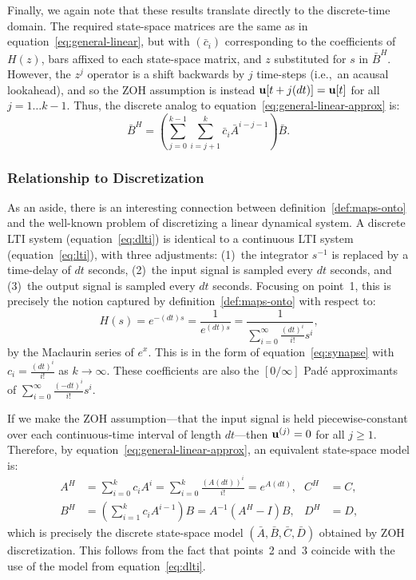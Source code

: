 Finally, we again note that these results translate directly to the discrete-time domain.
The required state-space matrices are the same as in equation~\ref{eq:general-linear}, but with $\left( \bar{c}_i \right)$ corresponding to the coefficients of $H(z)$, bars affixed to each state-space matrix, and $z$ substituted for $s$ in $\bar{B}^H$.
However, the $z^j$ operator is a shift backwards by $j$ time-steps (i.e.,~an acausal lookahead), and so the ZOH assumption is instead $\mathbf{u}[t+j(dt)] = \mathbf{u}[t]$ for all $j = 1 \ldots k - 1$.
Thus, the discrete analog to equation~\ref{eq:general-linear-approx} is:
\begin{equation}
\bar{B}^H = \left( \sum_{j=0}^{k-1} \sum_{i=j+1}^k \bar{c}_i \bar{A}^{i-j-1} \right) \bar{B} \text{.}
\end{equation}

\subsubsection{Relationship to Discretization}

As an aside, there is an interesting connection between definition~\ref{def:maps-onto} and the well-known problem of discretizing a linear dynamical system.
A discrete LTI system (equation~\ref{eq:dlti}) is identical to a continuous LTI system (equation~\ref{eq:lti}), with three adjustments: (1)~the integrator $s^{-1}$ is replaced by a time-delay of $dt$ seconds, (2)~the input signal is sampled every $dt$ seconds, and (3)~the output signal is sampled every $dt$ seconds.
Focusing on point~1, this is precisely the notion captured by definition~\ref{def:maps-onto} with respect to:
\begin{equation*}
H(s) = e^{-(dt)s} = \frac{1}{e^{(dt)s}} = \frac{1}{\sum_{i=0}^\infty \frac{(dt)^i}{i!} s^i} \text{,}
\end{equation*}
by the Maclaurin series of $e^{x}$.
This is in the form of equation~\ref{eq:synapse} with $c_i = \frac{(dt)^i}{i!}$ as $k \rightarrow \infty$.
These coefficients are also the $\left[ 0 / \infty \right]$ Pad\'e approximants of $\sum_{i=0}^\infty \frac{(-dt)^i}{i!} s^i$.

If we make the ZOH assumption---that the input signal is held piecewise-constant over each continuous-time interval of length $dt$---then $\mathbf{u}^{(j)} = 0$ for all $j \ge 1$.
Therefore, by equation~\ref{eq:general-linear-approx}, an equivalent state-space model is:
\begin{align*}
A^H &= \sum_{i=0}^k c_i A^i = \sum_{i=0}^k \frac{\left(A(dt)\right)^i}{i!} = e^{A(dt)} \text{,} & C^H &= C \text{,} \\
B^H &= \left( \sum_{i=1}^k c_i A^{i-1} \right) B = A^{-1} \left(A^H - I\right) B \text{,} & D^H &= D \text{,}
\end{align*}
which is precisely the discrete state-space model $(\bar{A}, \bar{B}, \bar{C}, \bar{D})$ obtained by ZOH discretization.
This follows from the fact that points~2 and~3 coincide with the use of the model from equation~\ref{eq:dlti}.

